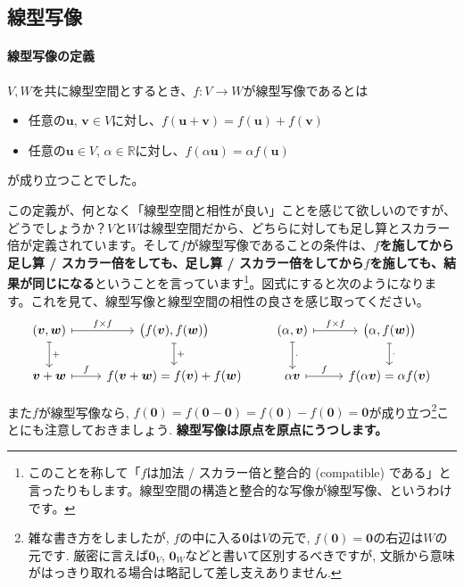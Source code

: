 \subsection{線型写像} \label{subsection:linear_map}

\paragraph{線型写像の定義}

$V, W$を共に線型空間とするとき、$f\colon V\rightarrow W$が線型写像であるとは
\begin{itemize}
\item 任意の$\bm{u}$, $\bm{v}\in V$に対し、$f(\bm{u} + \bm{v}) = f(\bm{u}) + f(\bm{v})$
\item 任意の$\bm{u}\in V$, $\alpha\in\mathbb{R}$に対し、$f(\alpha\bm{u}) = \alpha f(\bm{u})$
\end{itemize}
が成り立つことでした。

この定義が、何となく「線型空間と相性が良い」ことを感じて欲しいのですが、どうでしょうか？$V$と$W$は線型空間だから、どちらに対しても足し算とスカラー倍が定義されています。そして$f$が線型写像であることの条件は、\textbf{$f$を施してから足し算 / スカラー倍をしても、足し算 / スカラー倍をしてから$f$を施しても、結果が同じになる}ということを言っています\footnote{このことを称して「$f$は加法 / スカラー倍と整合的 (compatible) である」と言ったりもします。線型空間の構造と整合的な写像が線型写像、というわけです。}。図式にすると次のようになります。これを見て、線型写像と線型空間の相性の良さを感じ取ってください。
\[
\begin{tikzcd}
(\bm{v},\bm{w}) \arrow[mapsto]{r}{f\times f}  \arrow[mapsto]{d}{+} & \bigl(f(\bm{v}),f(\bm{w})\bigr) \arrow[mapsto]{d}{+} \\
\bm{v}+\bm{w} \arrow[mapsto]{r}{f} & f(\bm{v}+\bm{w})=f(\bm{v})+f(\bm{w})
\end{tikzcd}
\qquad
\begin{tikzcd}
(\alpha,\bm{v}) \arrow[mapsto]{r}{f\times f}  \arrow[mapsto]{d}{\cdot} & \bigl(\alpha,f(\bm{w})\bigr) \arrow[mapsto]{d}{\cdot}\\
\alpha\bm{v} \arrow[mapsto]{r}{f}  & f(\alpha\bm{v})=\alpha f(\bm{v})
\end{tikzcd}
\]

また$f$が線型写像なら, $f(\bm{0})=f(\bm{0}-\bm{0})=f(\bm{0})-f(\bm{0})=\bm{0}$が成り立つ\footnote{雑な書き方をしましたが, $f$の中に入る$\bm{0}$は$V$の元で, $f(\bm{0})=\bm{0}$の右辺は$W$の元です. 厳密に言えば$\bm{0}_V$, $\bm{0}_W$などと書いて区別するべきですが, 文脈から意味がはっきり取れる場合は略記して差し支えありません. }ことにも注意しておきましょう.  \textbf{線型写像は原点を原点にうつします。}

